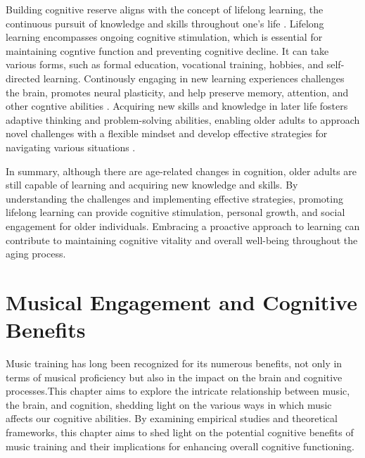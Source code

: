 Building cognitive reserve aligns with the concept of lifelong learning, the continuous pursuit of knowledge and skills throughout one's life \cite{Leipold2012}. Lifelong learning encompasses ongoing cognitive stimulation, which is essential for maintaining cogntive function and preventing cognitive decline. It can take various forms, such as formal education, vocational training, hobbies, and self-directed learning. Continously engaging in new learning experiences challenges the brain, promotes neural plasticity, and help preserve memory, attention, and other cogntive abilities \cite{Bangert2010}. Acquiring new skills and knowledge in later life fosters adaptive thinking and problem-solving abilities, enabling older adults to approach novel challenges with a flexible mindset and develop effective strategies for navigating various situations \cite{Greenwood2010}. 

In summary, although there are age-related changes in cognition, older adults are still capable of learning and acquiring new knowledge and skills. By understanding the challenges and implementing effective strategies, promoting lifelong learning can provide cognitive stimulation, personal growth, and social engagement for older individuals. Embracing a proactive approach to learning can contribute to maintaining cognitive vitality and overall well-being throughout the aging process.



\section{Musical Engagement and Cognitive Benefits}
Music training has long been recognized for its numerous benefits, not only in terms of musical proficiency but also in the impact on the brain and  cognitive processes.This chapter aims to explore the intricate relationship between music, the brain, and cognition, shedding light on the various ways in which music affects our cognitive abilities. By examining empirical studies and theoretical frameworks, this chapter aims to shed light on the potential cognitive benefits of music training and their implications for enhancing overall cognitive functioning.


